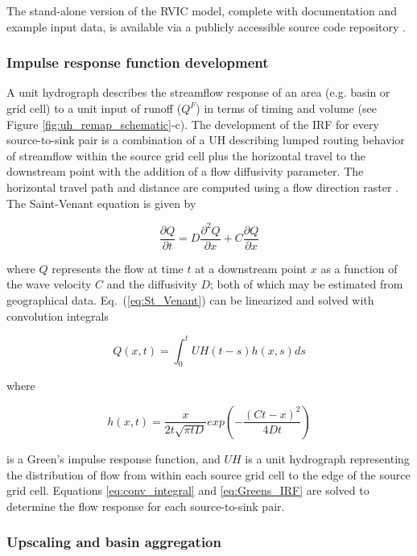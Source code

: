 \documentclass[jgrga, draft]{agutex}
\begin{document}
\begin{article}
\begin{itemize}[leftmargin=+.5in]
\begin{itemize}[leftmargin=+.5in]
The stand-alone version of the RVIC model, complete with documentation and example input data, is available via a publicly accessible source code repository \citep{Hamman_2015}.

\subsubsection{Impulse response function development}
\label{sec:irfs}

A unit hydrograph describes the streamflow response of an area (e.g. basin or grid cell) to a unit input of runoff ($Q^F$) in terms of timing and volume (see Figure \ref{fig:uh_remap_schematic}-c).
The development of the IRF for every source-to-sink pair is a combination of a UH describing lumped routing behavior of streamflow within the source grid cell plus the horizontal travel to the downstream point with the addition of a flow diffusivity parameter.
The horizontal travel path and distance are computed using a flow direction raster \citep[e.g.][]{Wu_2011}.
The Saint-Venant equation is given by

 \begin{equation}
   \label{eq:St_Venant}
   \frac{\partial Q}{\partial t} = D \frac{\partial^2 Q}{\partial x} + C \frac{\partial Q}{\partial x}
 \end{equation}

where $Q$ represents the flow at time $t$ at a downstream point $x$ as a function of the wave velocity $C$ and the diffusivity $D$; both of which may be estimated from geographical data. Eq.~(\ref{eq:St_Venant}) can be linearized and solved with convolution integrals

 \begin{equation}
   \label{eq:conv_integral}
	  Q(x,t) = \int_0^t UH(t-s)h(x,s)ds
 \end{equation}

where

 \begin{equation}
   \label{eq:Greens_IRF}
	h(x, t) = \frac{x}{2t\sqrt{\pi tD}}exp\left(-\frac{(Ct-x)^2}{4Dt}\right)
 \end{equation}

is a Green's impulse response function, and $UH$ is a unit hydrograph representing the distribution of flow from within each source grid cell to the edge of the source grid cell.
Equations \ref{eq:conv_integral} and \ref{eq:Greens_IRF} are solved to determine the flow response for each source-to-sink pair.

\subsubsection{Upscaling and basin aggregation}
\label{sec:remap}


\end{itemize}
\end{itemize}
\end{article}
\end{document}
